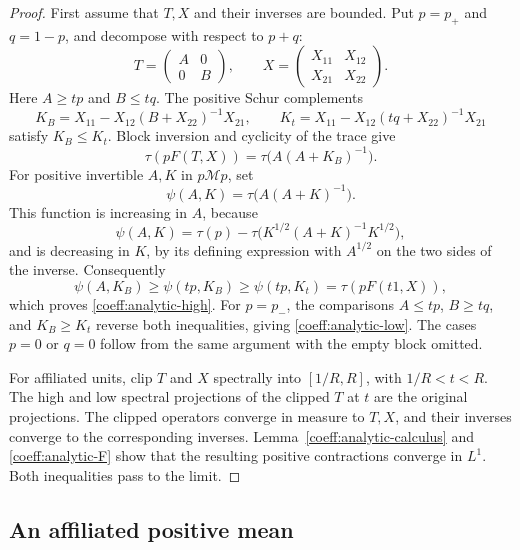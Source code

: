 \begin{proof}
First assume that \(T,X\) and their inverses are bounded.  Put
\(p=p_+\) and \(q=1-p\), and decompose with respect to \(p+q\):
\[
 T=\begin{pmatrix}A&0\\0&B\end{pmatrix},\qquad
 X=\begin{pmatrix}X_{11}&X_{12}\\X_{21}&X_{22}\end{pmatrix}.
\]
Here \(A\ge tp\) and \(B\le tq\).  The positive Schur complements
\[
 K_B=X_{11}-X_{12}(B+X_{22})^{-1}X_{21},\qquad
 K_t=X_{11}-X_{12}(tq+X_{22})^{-1}X_{21}
\]
satisfy \(K_B\le K_t\).  Block inversion and cyclicity of the trace give
\[
 \tau(pF(T,X))=\tau\bigl(A(A+K_B)^{-1}\bigr).
\]
For positive invertible \(A,K\) in \(p\mathcal Mp\), set
\[
 \psi(A,K)=\tau\bigl(A(A+K)^{-1}\bigr).
\]
This function is increasing in \(A\), because
\[
 \psi(A,K)=\tau(p)
  -\tau\bigl(K^{1/2}(A+K)^{-1}K^{1/2}\bigr),
\]
and is decreasing in \(K\), by its defining expression with
\(A^{1/2}\) on the two sides of the inverse.  Consequently
\[
 \psi(A,K_B)\ge\psi(tp,K_B)\ge\psi(tp,K_t)
                 =\tau(pF(t1,X)),
\]
which proves \eqref{coeff:analytic-high}.  For \(p=p_-\), the comparisons
\(A\le tp\), \(B\ge tq\), and \(K_B\ge K_t\) reverse both inequalities,
giving \eqref{coeff:analytic-low}.  The cases \(p=0\) or \(q=0\) follow
from the same argument with the empty block omitted.

For affiliated units, clip \(T\) and \(X\) spectrally into
\([1/R,R]\), with \(1/R<t<R\).  The high and low spectral projections
of the clipped \(T\) at \(t\) are the original projections.  The clipped
operators converge in measure to \(T,X\), and their inverses converge
to the corresponding inverses.  Lemma~\ref{coeff:analytic-calculus}
and \eqref{coeff:analytic-F} show that the resulting positive
contractions converge in \(L^1\).  Both inequalities pass to the limit.
\end{proof}

\subsection{An affiliated positive mean}

